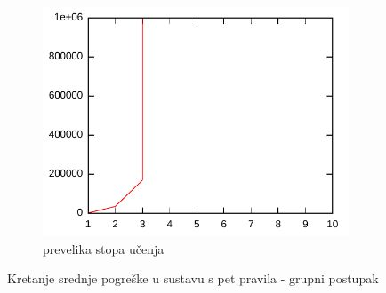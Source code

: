 \documentclass{article}
\begin{document}
\begin{figure}[h]
\begin{subfigure}[b]{0.32\textwidth}
        \includegraphics[width=\textwidth]{img/eta-batch-high.pdf}
        \caption{prevelika stopa učenja}
    \end{subfigure}
    \hfill
    \caption{Kretanje srednje pogreške u sustavu s pet pravila - grupni postupak}
    \label{eta-batch}
\end{figure}
\end{document}

